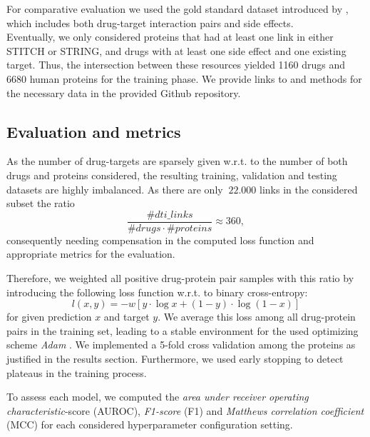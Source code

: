 \documentclass{bioinfo}
\begin{document}
For comparative evaluation we used the gold standard dataset introduced by \citet{Yaminishi2008}, which includes both drug-target interaction pairs and side effects.\\ 
 
Eventually, we only considered proteins that had at least one link in either STITCH or STRING, and drugs with at least one side effect and one existing target. Thus, the intersection between these resources yielded 1160 drugs and 6680 human proteins for the training phase. We provide links to and methods for the necessary data in the provided Github repository.\\

\subsection{Evaluation and metrics}

As the number of drug-targets are sparsely given w.r.t. to the number of both drugs and proteins considered, the
resulting training, validation and testing datasets are highly
imbalanced. As there are only $~22.000$ links in
the considered subset the ratio
\begin{equation*}
	\frac{\#dti\_links}{\#drugs \cdot \#proteins} \approx 360,
\end{equation*}
consequently needing compensation in the computed loss function and
appropriate metrics for the evaluation.

Therefore, we weighted all positive drug-protein pair samples with
this ratio by introducing the following loss function w.r.t. to binary cross-entropy:
\begin{equation}
	l(x,y) = - w \left[ y \cdot \log x + (1 - y) \cdot \log (1 - x) \right]
\end{equation}
for given prediction $x$ and target $y$. We average this loss among
all drug-protein pairs in the training set, leading to a stable
environment for the used optimizing scheme \textit{Adam}
\citep{Adam2014}. We implemented a 5-fold cross validation among the
proteins as justified in the results section. Furthermore, we used
early stopping to detect plateaus in the training process.

To assess each model, we computed the \textit{area under receiver
  operating characteristic}-score (AUROC), \textit{F1-score} (F1) and
\textit{Matthews correlation coefficient} (MCC) for each considered
hyperparameter configuration setting.
\end{document}
